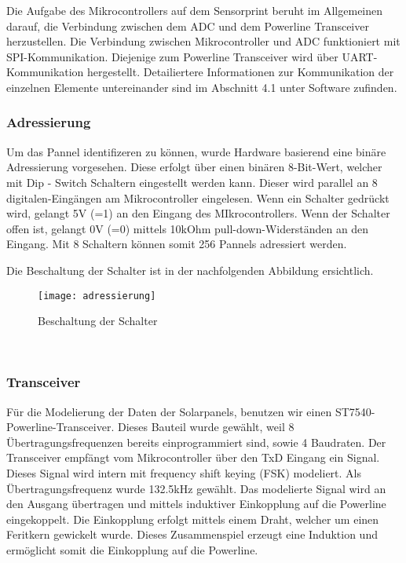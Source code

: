Die Aufgabe des Mikrocontrollers auf dem Sensorprint beruht im Allgemeinen darauf, die Verbindung zwischen dem ADC und dem Powerline Transceiver herzustellen. Die Verbindung zwischen Mikrocontroller und ADC funktioniert mit SPI-Kommunikation. Diejenige zum Powerline Transceiver wird über UART-Kommunikation hergestellt. Detailiertere Informationen zur Kommunikation der einzelnen Elemente untereinander sind im Abschnitt 4.1 unter Software zufinden.


\clearpage

\subsubsection{Adressierung}
Um das Pannel identifizeren zu können, wurde Hardware basierend eine binäre Adressierung vorgesehen. Diese erfolgt über einen binären 8-Bit-Wert, welcher mit Dip - Switch Schaltern eingestellt werden kann. Dieser wird parallel an 8 digitalen-Eingängen am Mikrocontroller eingelesen. Wenn ein Schalter gedrückt wird, gelangt 5V (=1) an den Eingang des MIkrocontrollers. Wenn der Schalter offen ist, gelangt 0V (=0) mittels 10kOhm pull-down-Widerständen an den Eingang. Mit 8 Schaltern können somit 256 Pannels adressiert werden. 

Die Beschaltung der Schalter ist in der nachfolgenden Abbildung ersichtlich.

\begin{figure}[h]
\centering
\texttt{[image: adressierung]}
\caption{Beschaltung der Schalter}
\end{figure}

\
\

\subsubsection{Transceiver}
Für die Modelierung der Daten der Solarpanels, benutzen wir einen ST7540-Powerline-Transceiver. Dieses Bauteil wurde gewählt, weil 8 Übertragungsfrequenzen bereits einprogrammiert sind, sowie 4 Baudraten. Der Transceiver empfängt vom Mikrocontroller über den TxD Eingang ein Signal. Dieses Signal wird intern mit frequency shift keying (FSK) modeliert. Als Übertragungsfrequenz wurde 132.5kHz gewählt. Das modelierte Signal wird an den Ausgang übertragen und mittels induktiver Einkopplung auf die Powerline eingekoppelt. Die Einkopplung erfolgt mittels einem Draht, welcher um einen Feritkern gewickelt wurde. Dieses Zusammenspiel erzeugt eine Induktion und ermöglicht somit die Einkopplung auf die Powerline.

